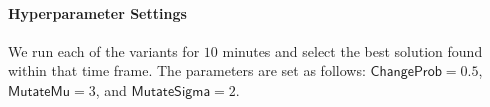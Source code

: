 
    
    
\paragraph{Hyperparameter Settings}
We run each of the variants for $10$ minutes and select the best solution found within that time frame. The parameters are set as follows: $\mathsf{ChangeProb} = 0.5$, $\mathsf{MutateMu} = 3$, and $\mathsf{MutateSigma} = 2$.


 







